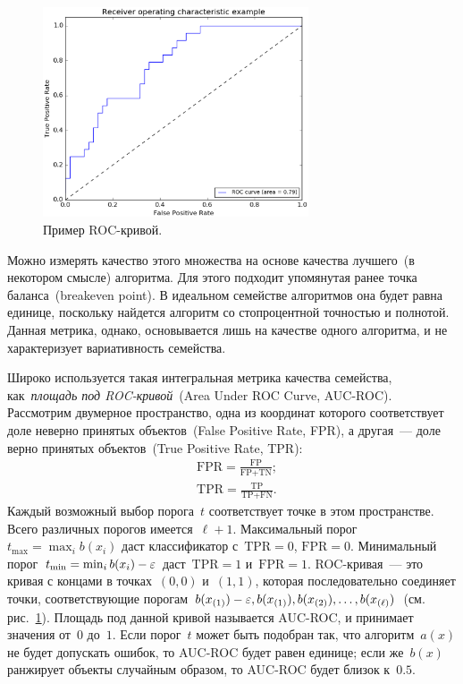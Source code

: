 \documentclass[12pt,fleqn]{article}
\begin{document}
\begin{figure}[t]
    \centering
    \includegraphics[width=0.7\textwidth]{plot_roc_001.eps}
    \caption{Пример ROC-кривой.}
    \label{fig:roc}
\end{figure}

Можно измерять качество этого множества на основе качества лучшего~(в некотором смысле) алгоритма.
Для этого подходит упомянутая ранее точка баланса~(breakeven point).
В идеальном семействе алгоритмов она будет равна единице, поскольку найдется
алгоритм со стопроцентной точностью и полнотой.
Данная метрика, однако, основывается лишь на качестве одного алгоритма,
и не характеризует вариативность семейства.

Широко используется такая интегральная метрика качества семейства,
как~\emph{площадь под ROC-кривой}~(Area Under ROC Curve, AUC-ROC).
Рассмотрим двумерное пространство, одна из координат которого соответствует
доле неверно принятых объектов~(False Positive Rate, FPR),
а другая~--- доле верно принятых объектов~(True Positive Rate, TPR):
\begin{align*}
    &\text{FPR}
    =
    \frac{
        \text{FP}
    }{
        \text{FP} + \text{TN}
    };\\
    &\text{TPR}
    =
    \frac{
        \text{TP}
    }{
        \text{TP} + \text{FN}
    }.
\end{align*}
Каждый возможный выбор порога~$t$ соответствует точке в этом пространстве.
Всего различных порогов имеется~$\ell + 1$.
Максимальный порог~$t_{\max} = \max_{i} b(x_i)$ даст классификатор
с~$\text{TPR} = 0$, $\text{FPR} = 0$.
Минимальный порог~$t_{\min} = \min_{i} b(x_i) - \varepsilon$ даст~$\text{TPR} = 1$
и~$\text{FPR} = 1$.
ROC-кривая~--- это кривая с концами в точках~$(0, 0)$ и~$(1, 1)$,
которая последовательно соединяет точки, соответствующие
порогам~$b(x_{(1)}) - \varepsilon, b(x_{(1)}), b(x_{(2)}), \dots, b(x_{(\ell)})$~(см. рис.~\ref{fig:roc}).
Площадь под данной кривой называется AUC-ROC, и принимает значения от~$0$ до~$1$.
Если порог~$t$ может быть подобран так, что алгоритм~$a(x)$ не будет допускать ошибок,
то AUC-ROC будет равен единице;
если же~$b(x)$ ранжирует объекты случайным образом, то AUC-ROC будет близок к~$0.5$.
\end{document}
